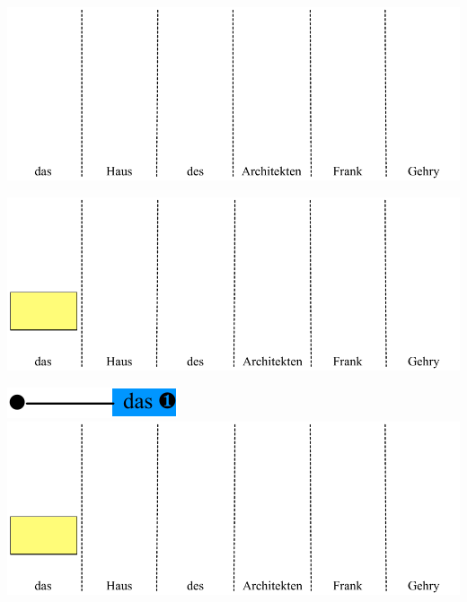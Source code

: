 \documentclass[landscape]{slides}
\begin{document}

\begin{center}\vspace{55mm}
\includegraphics[scale=1.4]{accessing-grammar-rules-early-example00.pdf}
\end{center}


\begin{center}\vspace{55mm}
\includegraphics[scale=1.4]{accessing-grammar-rules-early-example0.pdf}
\end{center}


\begin{center}\vspace{15mm}
\includegraphics[scale=1.4]{accessing-grammar-rules-prefix-early0.pdf}\\[31mm]
\includegraphics[scale=1.4]{accessing-grammar-rules-early-example0.pdf}
\end{center}
\end{document}
